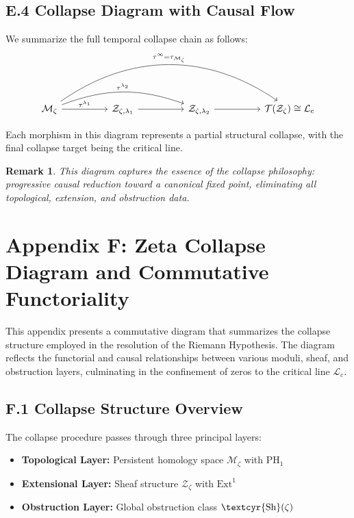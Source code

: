 \documentclass[11pt]{article}
\newtheorem{remark}[theorem]{Remark}
\newcommand{\Sha}{\text{\textcyr{Sh}}}
\begin{document}
\subsection*{E.4 Collapse Diagram with Causal Flow}

We summarize the full temporal collapse chain as follows:
\[
\begin{tikzcd}[column sep=huge]
\mathcal{M}_\zeta \arrow[r, "\tau^{\lambda_1}"] \arrow[rr, bend left=20, "\tau^{\lambda_2}"] \arrow[rrr, bend left=35, "\tau^{\infty} = \tau_{\mathcal{M}_\zeta}"] 
& \mathcal{Z}_{\zeta, \lambda_1} \arrow[r] 
& \mathcal{Z}_{\zeta, \lambda_2} \arrow[r] 
& \mathcal{T}(\mathcal{Z}_\zeta) \cong \mathcal{L}_c
\end{tikzcd}
\]

Each morphism in this diagram represents a partial structural collapse, with the final collapse target being the critical line.

\begin{remark}
This diagram captures the essence of the collapse philosophy:  
progressive causal reduction toward a canonical fixed point, eliminating all topological, extension, and obstruction data.
\end{remark}



\section*{Appendix F: Zeta Collapse Diagram and Commutative Functoriality}

This appendix presents a commutative diagram that summarizes the collapse structure employed in the resolution of the Riemann Hypothesis.  
The diagram reflects the functorial and causal relationships between various moduli, sheaf, and obstruction layers,  
culminating in the confinement of zeros to the critical line $\mathcal{L}_c$.

\subsection*{F.1 Collapse Structure Overview}

The collapse procedure passes through three principal layers:

\begin{itemize}
    \item \textbf{Topological Layer:} Persistent homology space $\mathcal{M}_\zeta$ with $\mathrm{PH}_1$
    \item \textbf{Extensional Layer:} Sheaf structure $\mathcal{Z}_\zeta$ with $\mathrm{Ext}^1$
    \item \textbf{Obstruction Layer:} Global obstruction class $\Sha(\zeta)$
\end{itemize}
\end{document}

